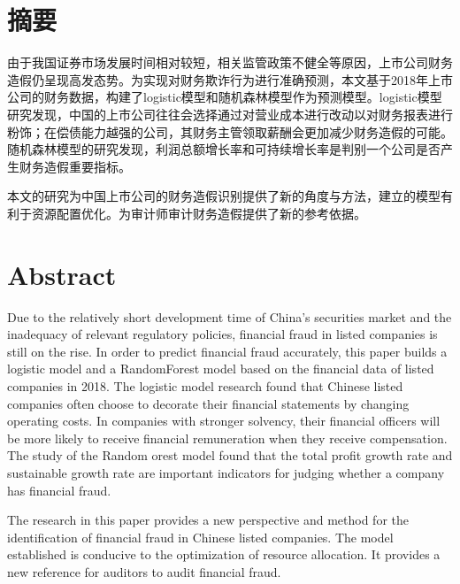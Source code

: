 \chapter*{摘要}


由于我国证券市场发展时间相对较短，相关监管政策不健全等原因，上市公司财务造假仍呈现高发态势。为实现对财务欺诈行为进行准确预测，本文基于2018年上市公司的财务数据，构建了logistic模型和随机森林模型作为预测模型。logistic模型研究发现，中国的上市公司往往会选择通过对营业成本进行改动以对财务报表进行粉饰；在偿债能力越强的公司，其财务主管领取薪酬会更加减少财务造假的可能。随机森林模型的研究发现，利润总额增长率和可持续增长率是判别一个公司是否产生财务造假重要指标。

本文的研究为中国上市公司的财务造假识别提供了新的角度与方法，建立的模型有利于资源配置优化。为审计师审计财务造假提供了新的参考依据。	




\chapter*{\bfseries Abstract}

Due to the relatively short development time of China's securities market and the inadequacy of relevant regulatory policies, financial fraud in listed companies is still on the rise. In order to predict financial fraud accurately, this paper builds a logistic model and a RandomForest model based on the financial data of listed companies in 2018. 
The logistic model research found that Chinese listed companies often choose to decorate their financial statements by changing operating costs. In companies with stronger solvency, their financial officers will be more likely to receive financial remuneration when they receive compensation. The study of the Random orest model found that the total profit growth rate and sustainable growth rate are important indicators for judging whether a company has financial fraud.

The research in this paper provides a new perspective and method for the identification of financial fraud in Chinese listed companies. The model established is conducive to the optimization of resource allocation. It provides a new reference for auditors to audit financial fraud.


